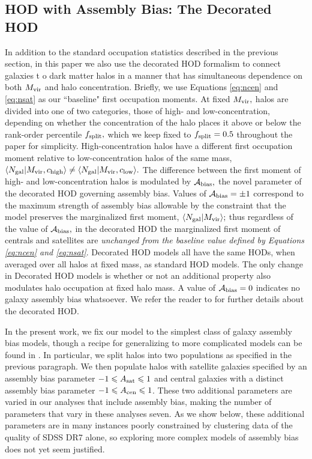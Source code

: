 \documentclass[usenatbib,usegraphicx,letterpaper]{mn2e}
\newcommand{\mvir}{M_{\rm vir}}
\newcommand{\ngal}{N_{\rm gal}}
\newcommand{\abias}{\mathcal{A}_{\rm bias}}
\begin{document}
\subsection{HOD with Assembly Bias: The Decorated HOD}
\label{subsection:decorated}

In addition to the standard occupation statistics described in the previous section, 
in this paper we also use the decorated HOD formalism to connect galaxies t
o dark matter halos in a manner that has simultaneous dependence on both $\mvir$ and halo concentration. 
Briefly, we use Equations \ref{eq:ncen} and \ref{eq:nsat} as our ``baseline" first occupation moments. 
At fixed $\mvir,$ halos are divided into one of two categories, those of high- and low-concentration, 
depending on whether the concentration of the halo places it above or below the rank-order percentile 
$f_{\rm split},$ which we keep fixed to $f_{\rm split}=0.5$ throughout the paper for simplicity. 
High-concentration halos have a different first occupation moment relative to low-concentration 
halos of the same mass, $\langle\ngal|\mvir, c_{\rm high}\rangle \neq \langle\ngal|\mvir, c_{\rm low}\rangle.$ The difference between the first moment of high- and low-concentration halos is modulated by $\abias,$ the novel parameter of the decorated HOD governing assembly bias. Values of $\abias=\pm1$ correspond to the maximum strength of assembly bias allowable by the constraint that the model preserves the marginalized first moment, $\langle\ngal|\mvir\rangle;$ thus regardless of the value of $\abias,$ in the decorated HOD the marginalized first moment of centrals and satellites are {\em unchanged from the baseline value defined by Equations \ref{eq:ncen} and \ref{eq:nsat}}. 
Decorated HOD models all have the same HODs, when averaged over all halos at fixed mass, as standard HOD models. The only 
change in Decorated HOD models is whether or not an additional property also modulates halo occupation at fixed halo mass. A 
value of $\abias = 0$ indicates no galaxy assembly bias whatsoever. We refer the reader to \citet{hearin_etal16} for 
further details about the decorated HOD. 

In the present work, we fix our model to the simplest class of galaxy assembly bias models, though a recipe for 
generalizing to more complicated models can be found in \citet{hearin_etal16}. In particular, we split halos into 
two populations as specified in the previous paragraph. We then populate halos with satellite galaxies specified 
by an assembly bias parameter $-1 \le A_{\rm sat} \le 1$ and central galaxies with a distinct assembly bias 
parameter $-1 \le A_{\rm cen} \le 1$. These two additional parameters are varied in our analyses that include 
assembly bias, making the number of parameters that vary in these analyses seven. As we show below, 
these additional parameters are in many instances poorly constrained by clustering data of the quality of 
SDSS DR7 alone, so exploring more complex models of assembly bias does not yet seem justified.
\end{document}
